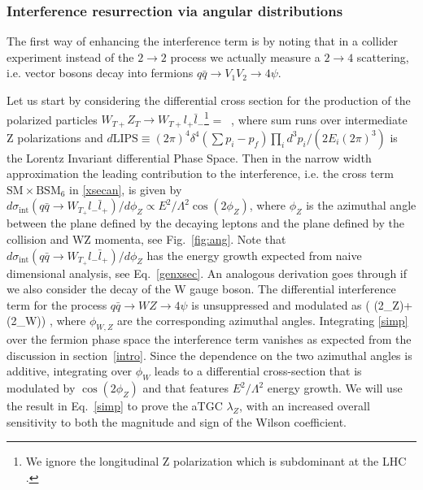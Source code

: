 \documentclass[../report.tex]{subfiles}
\begin{document}
\subsubsection*{Interference resurrection via angular distributions}
\label{angs}

The first way of enhancing the interference term is by noting that in a collider experiment instead of the  $2\to 2$ process we actually measure a $2\to 4$ scattering, i.e. vector bosons decay into fermions $q\bar q\to V_1V_2\to 4 \psi$.  

Let us start by considering  the differential cross section for the production of the polarized particles $W_{T+} Z_T \rightarrow W_{T+}  l_+ \bar l_-$\footnote{ We ignore the  longitudinal Z polarization which is subdominant at the LHC \cite{Baur:1994ia}.}
\be
{} =
    
\,  , \label{xsecan}
\ee
where   sum runs over intermediate Z polarizations and $d\text{LIPS}\equiv (2\pi)^4\delta^4(\sum p_i -p_f) \prod_i {d^3 p_i}/\left(2 E_i(2\pi)^3\right)$ is the Lorentz Invariant differential 
Phase Space.  
%
Then in the narrow width approximation the leading contribution to the interference, i.e. the cross term $\text{SM}\times\text{BSM}_6$ in \ref{xsecan},   is given by
$
d\sigma_\text{int}(q\bar q \rightarrow W_{T_+} l_- \bar l_+)/ d\phi_Z \propto E^2/\Lambda^2 \cos(2\phi_Z) 
$, 
where  $\phi_Z$  is the azimuthal angle between the plane defined by the decaying leptons and the plane defined by the collision and WZ momenta, see Fig.~\ref{fig:ang}.  Note that $d\sigma_\text{int}(q\bar q \rightarrow W_{T_+} l_- \bar l_+)/ d\phi_Z $ has the energy growth expected from naive dimensional analysis, see  Eq.~\ref{genxsec}.
An analogous derivation goes through if we also consider the decay of the W gauge boson. The differential interference term   for the process $q\bar q\to WZ\to 4 \psi$ is  unsuppressed and modulated as
\bea
   \propto {}\left( \cos(2\phi_Z)+\cos(2\phi_W)\right) , \label{simp}
\eea
where $\phi_{W,Z}$ are the corresponding azimuthal angles. 
Integrating  \ref{simp} over the fermion phase space the   interference term vanishes as expected from the discussion in section~\ref{intro}. 
Since the dependence on the two azimuthal angles is additive, integrating  over $\phi_W$ leads to a differential cross-section that is modulated by $\cos(2\phi_Z)$ and that features $E^2/\Lambda^2$ energy growth. 
We will use the result in Eq.~\ref{simp}  to prove the aTGC $\lambda_Z$, with an increased  overall sensitivity  to both the magnitude and sign of the Wilson coefficient.
\end{document}

